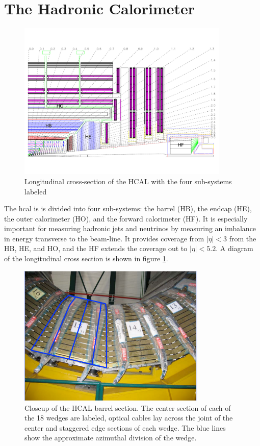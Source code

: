 \section{The Hadronic Calorimeter}
\label{hcal_description}

\begin{figure}[h]
   \centering
  \includegraphics[width=0.9\textwidth]{Figures/CMS_Diagrams/HCAL__Layout.pdf}
  \caption{Longitudinal cross-section of the HCAL with the four
    sub-systems labeled} \label{fig:hcal_layout}
\end{figure}

\par The \acrfull{hcal} is is divided into four sub-systems: the
barrel (HB), the endcap (HE), the outer calorimeter (HO), and the
forward calorimeter (HF).   It is especially important for measuring
hadronic jets and neutrinos by measuring an imbalance in energy
transverse to the beam-line.  It provides coverage from $|\eta|<3$ from
the HB, HE, and HO, and the HF extends the coverage out to
$|\eta|<5.2$.  A diagram of the longitudinal cross
section is shown in figure \ref{fig:hcal_layout}.

\begin{figure}[h]
   \centering
  \includegraphics[width=0.8\textwidth]{Figures/CMS_Diagrams/HCAL__Wedge_WithAzDiv.pdf}
  \caption{Closeup of the HCAL barrel section.  The center section of
    each of the 18 wedges are labeled, optical cables lay across the
    joint of the center and staggered edge sections of each wedge.
    The blue lines show the approximate azimuthal division of the
    wedge.} \label{fig:hcal_hb_wedge}
\end{figure}

